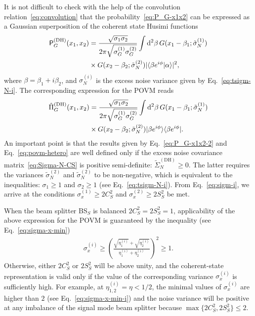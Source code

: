 \documentclass[%
reprint,
superscriptaddress,
 amsmath,amssymb,amsfonts,
 aps,
 pra,
 longbibliography
]{revtex4-2}
\newcommand{\ket}[1]{\ensuremath{|{#1}\rangle}}
\newcommand{\bra}[1]{\ensuremath{\langle{#1}|}}
\newcommand{\avr}[1]{\ensuremath{\langle{#1}\rangle}}
\newcommand{\ind}[1]{\mathrm{#1}}
\newcommand{\prob}{\mathsf{P}}
\newcommand{\dd}{\mathrm{d}}
\begin{document}
It is not difficult to check
with the help of the convolution relation~\eqref{eq:convolution}
that the probability~\eqref{eq:P_G-x1x2}
can be expressed
as a Gaussian superposition of the coherent state Husimi functions
\begin{align}
  \label{eq:P_G-x1x2-2}
    \prob_G^{(\ind{DH})}(x_1,x_2)&=\frac{\sqrt{\sigma_1\sigma_2}}{2\pi\sqrt{\sigma_G^{(1)}\sigma_G^{(2)}}}
\int\dd^2 \beta\,
    G(x_1-\beta_1;\tilde{\sigma}_N^{(1)})
    \notag
  \\
  &
    \times
    G(x_2-\beta_2;\tilde{\sigma}_N^{(2)})
    |\avr{\beta e^{i\phi}|\alpha}|^2,
\end{align}
where $\beta=\beta_1+i\beta_2$, and
$\sigma_N^{(i)}$ is
the excess noise variance  given by Eq.~\eqref{eq:tsigm-N-i}.
The corresponding expression for the
POVM reads
\begin{align}
  \label{eq:povm-hetero}
    \hat{\Pi}_G^{(\ind{DH})}(x_1,x_2)&=\frac{\sqrt{\sigma_1\sigma_2}}{2\pi\sqrt{\sigma_G^{(1)}\sigma_G^{(2)}}}
\int \dd^2 \beta\,
    G(x_1-\beta_1;\tilde{\sigma}_N^{(1)})
    \notag
  \\
  &
    \times
    G(x_2-\beta_2;\tilde{\sigma}_N^{(2)})
    \ket{\beta e^{i\phi}}\bra{\beta e^{i\phi}}.
\end{align}
An important point is that
the results given by Eq.~\eqref{eq:P_G-x1x2-2} and
Eq.~\eqref{eq:povm-hetero}
are well defined only if
the excess noise covariance matrix~\eqref{eq:Sigma-N-CS}
is positive semi-definite: $\tilde\Sigma^{\ind{(DH)}}_N\ge 0$.
The latter requires the variances
$\tilde{\sigma}_N^{(2)}$ and $\tilde{\sigma}_N^{(2)}$ to be non-negative,
which is equivalent to the inequalities:
$\sigma_1\ge 1$ and $\sigma_2\ge 1$ (see Eq.~\eqref{eq:tsigm-N-i}).
From Eq.~\eqref{eq:sigm-i},
we arrive at the conditions
$\sigma_x^{(1)}\ge 2 C_S^2$ and $\sigma_x^{(2)}\ge 2 S_S^2$ be met.

When the beam splitter BS$_S$
is balanced $2 C_S^2=2 S_S^2=1$,
applicability of the above expression for the POVM
is guaranteed by the
inequality (see Eq.~\eqref{eq:sigma-x-min})
\begin{align}
  \label{eq:sigma-x-min-i}
  \sigma_x^{(i)}\ge \left(
\frac{\sqrt{\eta_1^{(i)}}+\sqrt{\eta_2^{(i)}}}{\eta_1^{(i)}+\eta_2^{(i)}}
  \right)^2\ge 1.
\end{align}
Otherwise, either $2 C_S^2$ or $2 S_S^2$ will be above unity,
and the coherent-state representation is valid only if
the value of the corresponding variance $\sigma_x^{(i)}$ is sufficiently high.
For example, at $\eta_{1,2}^{(i)}=\eta<1/2$,
the minimal values of $\sigma_x^{(i)}$ are higher than $2$
(see Eq.~\eqref{eq:sigma-x-min-i})
and the noise variance will be positive at
any imbalance of the signal mode beam splitter
because $\max\{2 C_S^2,2 S_S^2\}\le 2$.
\end{document}

